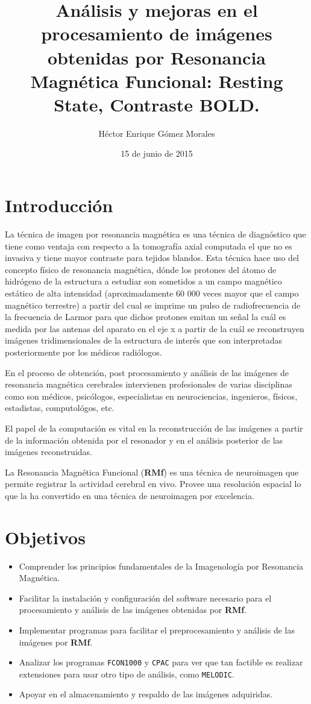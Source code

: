 \documentclass{article}
\author{Héctor Enrique Gómez Morales}
\title{Análisis y mejoras en el procesamiento de imágenes obtenidas por Resonancia Magnética Funcional: Resting State, Contraste BOLD.}
\date{15 de junio de 2015}
\begin{document}
\section{Introducción}

La técnica de imagen por resonancia magnética es una técnica de diagnóstico que tiene como ventaja con respecto a la tomografía axial computada el que no es invasiva y tiene mayor contraste para tejidos blandos. Esta técnica hace uso del concepto físico de resonancia magnética, dónde los protones del átomo de hidrógeno de la estructura a estudiar son sometidos a un campo magnético estático de alta intensidad (aproximadamente 60 000 veces mayor que el campo magnético terrestre) a partir del cual se imprime un pulso de radiofrecuencia de la frecuencia de Larmor para que dichos protones emitan un señal la cuál es medida por las antenas del aparato en el eje x a partir de la cuál se reconstruyen imágenes tridimensionales de la estructura de interés que son interpretadas posteriormente por los médicos radiólogos.

En el proceso de obtención, post procesamiento y análisis de las imágenes de resonancia magnética cerebrales intervienen profesionales de varias disciplinas como son médicos, psicólogos, especialistas en neurociencias, ingenieros, físicos, estadistas, computológos, etc.

El papel de la computación es vital en la reconstrucción de las imágenes a partir de la información obtenida por el resonador y en el análisis posterior de las imágenes reconstruidas.

La Resonancia Magnética Funcional (\textbf{RMf}) es una técnica de neuroimagen que permite registrar la actividad cerebral en vivo. Provee una resolución espacial lo que la ha convertido en una técnica de neuroimagen por excelencia. 

\section{Objetivos}

\begin{itemize}
\item Comprender los principios fundamentales de la Imagenología por Resonancia Magnética.

\item Facilitar la instalación y configuración del software necesario para el procesamiento y análisis de las imágenes obtenidas por \textbf{RMf}.

\item Implementar programas para facilitar el preprocesamiento y análisis de las imágenes por \textbf{RMf}.

\item Analizar los programas \texttt{FCON1000} y \texttt{CPAC} para ver que tan factible es realizar extensiones para usar otro tipo de análisis, como \texttt{MELODIC}.

\item Apoyar en el almacenamiento y respaldo de las imágenes adquiridas.
\end{itemize}
\end{document}
